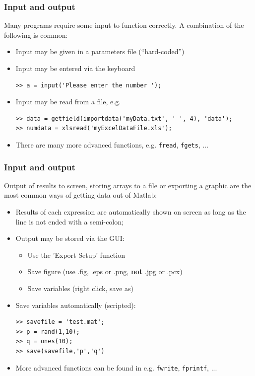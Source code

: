\documentclass[11pt,table,final,fleqn,xcolor={usenames,dvipsnames},unknownkeysallowed,handout]{beamer}
\begin{document}
\begin{frame}[fragile]
 \frametitle{Input and output}
 Many programs require some input to function correctly. A combination of the following is common:
 \begin{itemize}[<+->]
   \item Input may be given in a parameters file (``hard-coded'')
   \item Input may be entered via the keyboard
   \begin{lstlisting}
>> a = input('Please enter the number ');
   \end{lstlisting}
   \item Input may be read from a file, e.g.
    \begin{lstlisting}
>> data = getfield(importdata('myData.txt', ' ', 4), 'data');
>> numdata = xlsread('myExcelDataFile.xls');
   \end{lstlisting}
   \item There are many more advanced functions, e.g. \lstinline$fread$, \lstinline$fgets$, ...
 \end{itemize}
\end{frame}

\begin{frame}[fragile]
 \frametitle{Input and output}
 Output of results to screen, storing arrays to a file or exporting a graphic are the most common ways of getting data out of Matlab:
 \begin{itemize}[<+->]
   \item Results of each expression are automatically shown on screen as long as the line is not ended with a semi-colon;
   \item Output may be stored via the GUI:
    \begin{itemize}
      \item Use the 'Export Setup' function
      \item Save figure (use .fig, .eps or .png, \textbf{not} .jpg or .pcx)
      \item Save variables (right click, save as)
    \end{itemize}
   \item Save variables automatically (scripted):
    \begin{lstlisting}
>> savefile = 'test.mat';
>> p = rand(1,10);
>> q = ones(10);
>> save(savefile,'p','q')
   \end{lstlisting}
   \item More advanced functions can be found in e.g.  \lstinline$fwrite$, \lstinline$fprintf$, ...
 \end{itemize}
\end{frame}
\end{document}
